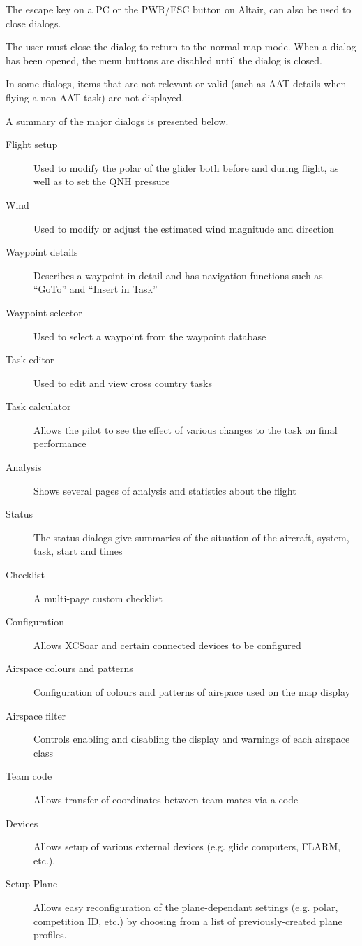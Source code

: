 The escape key on a PC or the PWR/ESC button on Altair, can also be used to
close dialogs.

The user must close the dialog to return to the normal map mode. When a dialog
has been opened, the menu buttons are disabled until the dialog is closed.

In some dialogs, items that are not relevant or valid (such as AAT details when
flying a non-AAT task) are not displayed.

A summary of the major dialogs is presented below.
\begin{description}
\item[Flight setup] Used to modify the polar of the glider both before and
during flight, as well as to set the QNH pressure
\item[Wind] Used to modify or adjust the estimated wind magnitude and direction
\item[Waypoint details] Describes a waypoint in detail and has navigation
functions such as ``GoTo'' and ``Insert in Task''
\item[Waypoint selector] Used to select a waypoint from the waypoint database
\item[Task editor] Used to edit and view cross country tasks
\item[Task calculator] Allows the pilot to see the effect of various changes to
the task on final performance
\item[Analysis] Shows several pages of analysis and statistics about the flight
\item[Status] The status dialogs give summaries of the situation of the 
aircraft, system, task, start and times
\item[Checklist] A multi-page custom checklist
\item[Configuration] Allows XCSoar and certain connected devices to be
configured
\item[Airspace colours and patterns] Configuration of colours and patterns of
airspace used on the map display
\item[Airspace filter] Controls enabling and disabling the display and warnings
of each airspace class
\item[Team code] Allows transfer of coordinates between team mates via a code
\item[Devices]  Allows setup of various external devices (e.g. glide computers, FLARM, etc.).
\item[Setup Plane]  Allows easy reconfiguration of the plane-dependant settings (e.g. polar, competition ID, etc.) by choosing from a list of previously-created plane profiles.
\end{description}

